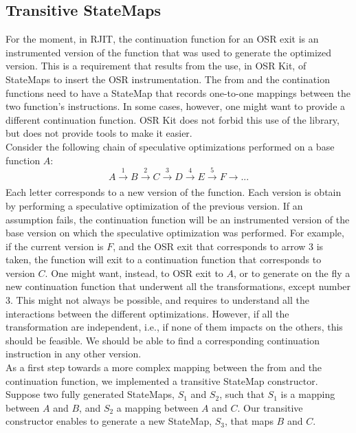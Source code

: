 \subsection{Transitive StateMaps}
For the moment, in RJIT, the continuation function for an OSR exit is an instrumented version of the function that was used to generate the optimized version.
This is a requirement that results from the use, in OSR Kit\cite{OSRKit}, of StateMaps to insert the OSR instrumentation.
The from and the contination functions need to have a StateMap that records one-to-one mappings between the two function's instructions.
In some cases, however, one might want to provide a different continuation function.
OSR Kit does not forbid this use of the library, but does not provide tools to make it easier.\\  

Consider the following chain of speculative optimizations performed on a base function $A$: 
$$A \xrightarrow[]{1} B \xrightarrow[]{2} C \xrightarrow[]{3} D \xrightarrow[]{4} E \xrightarrow[]{5} F \rightarrow ...$$
Each letter corresponds to a new version of the function. 
Each version is obtain by performing a speculative optimization of the previous version.
If an assumption fails, the continuation function will be an instrumented version of the base version on which the speculative optimization was performed.
For example, if the current version is $F$, and the OSR exit that corresponds to arrow 3 is taken, 
the function will exit to a continuation function that corresponds to version $C$.
One might want, instead, to OSR exit to $A$, or to generate on the fly a new continuation function that underwent all the transformations, except number 3. 
This might not always be possible, and requires to understand all the interactions between the different optimizations.
However, if all the transformation are independent, i.e., if none of them impacts on the others, this should be feasible.
We should be able to find a corresponding continuation instruction in any other version.\\

As a first step towards a more complex mapping between the from and the continuation function, we implemented a transitive StateMap constructor.
Suppose two fully generated StateMaps, $S_1$ and $S_2$, such that $S_1$ is a mapping between $A$ and $B$, and $S_2$ a mapping between $A$ and $C$.
Our transitive constructor enables to generate a new StateMap, $S_3$, that maps $B$ and $C$.\\

